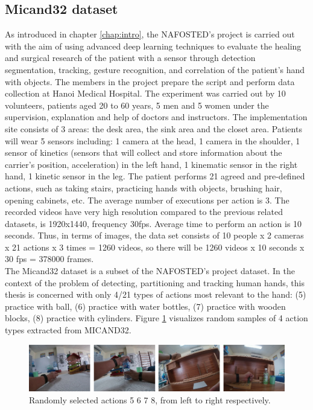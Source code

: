 \subsection{Micand32 dataset} \label{subsec:micand32}
As introduced in chapter \ref{chap:intro}, the NAFOSTED’s project is carried out with the aim of using advanced deep learning techniques to evaluate the healing and surgical research of the patient with a sensor through detection segmentation, tracking, gesture recognition, and correlation of the patient's hand with objects. The members in the project prepare the script and perform data collection at Hanoi Medical Hospital. The experiment was carried out by 10 volunteers, patients aged 20 to 60 years, 5 men and 5 women under the supervision, explanation and help of doctors and instructors. The implementation site consists of 3 areas: the desk area, the sink area and the closet area. Patients will wear 5 sensors including: 1 camera at the head, 1 camera in the shoulder, 1 sensor of kinetics (sensors that will collect and store information about the carrier's position, acceleration) in the left hand, 1 kinematic sensor in the right hand, 1 kinetic sensor in the leg. The patient performs 21 agreed and pre-defined actions, such as taking stairs, practicing hands with objects, brushing hair, opening cabinets, etc. The average number of executions per action is 3. The recorded videos have very high resolution compared to the previous related datasets, is 1920x1440, frequency 30fps. Average time to perform an action is 10 seconds. Thus, in terms of images, the data set consists of 10 people x 2 cameras x 21 actions x 3 times = 1260 videos, so there will be 1260 videos x 10 seconds x 30 fps = 378000 frames.
\\The Micand32 dataset is a subset of the NAFOSTED's project dataset. In the context of the problem of detecting, partitioning and tracking human hands, this thesis is concerned with only 4/21 types of actions most relevant to the hand: (5) practice with ball, (6) practice with water bottles, (7) practice with wooden blocks, (8) practice with cylinders. Figure \ref{fig:micand32} visualizes random samples of 4 action types extracted from MICAND32.
\begin{figure}
	\centerline{\includegraphics[width=1\linewidth]{Figs/micand32.png}}
	\caption{Randomly selected actions 5 6 7 8, from left to right respectively.}
	\label{fig:micand32}
\end{figure}

